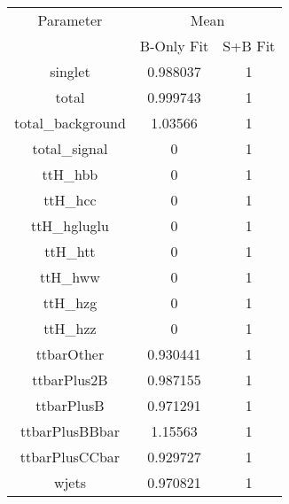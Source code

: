 \begin{table}
\centering

\begin{tabular}{ccc}
\toprule
Parameter 	& \multicolumn{2}{c}{Mean}\\
 	& B-Only Fit & S+B Fit\\
\midrule
singlet 	& \num{0.988037} 	& \num{1}\\
total 	& \num{0.999743} 	& \num{1}\\
total\_background 	& \num{1.03566} 	& \num{1}\\
total\_signal 	& \num{0} 	& \num{1}\\
ttH\_hbb 	& \num{0} 	& \num{1}\\
ttH\_hcc 	& \num{0} 	& \num{1}\\
ttH\_hgluglu 	& \num{0} 	& \num{1}\\
ttH\_htt 	& \num{0} 	& \num{1}\\
ttH\_hww 	& \num{0} 	& \num{1}\\
ttH\_hzg 	& \num{0} 	& \num{1}\\
ttH\_hzz 	& \num{0} 	& \num{1}\\
ttbarOther 	& \num{0.930441} 	& \num{1}\\
ttbarPlus2B 	& \num{0.987155} 	& \num{1}\\
ttbarPlusB 	& \num{0.971291} 	& \num{1}\\
ttbarPlusBBbar 	& \num{1.15563} 	& \num{1}\\
ttbarPlusCCbar 	& \num{0.929727} 	& \num{1}\\
wjets 	& \num{0.970821} 	& \num{1}\\
\bottomrule
\end{tabular}
\end{table}
